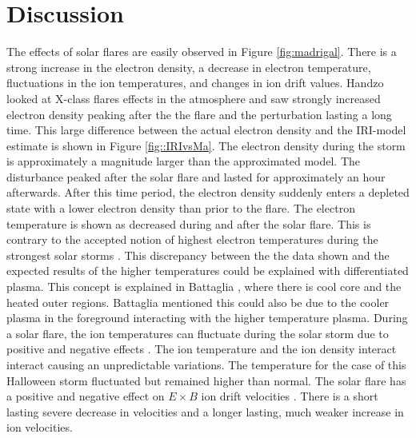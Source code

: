
\section{Discussion}

The effects of solar flares are easily observed in Figure \ref{fig:madrigal}.
There is a strong increase in the electron density, a decrease in electron temperature, fluctuations in the ion temperatures, and changes in ion drift values.
Handzo \cite{Handzo} looked at X-class flares effects in the atmosphere and saw strongly increased electron density peaking after the the flare and the perturbation lasting a long time. This large difference between the actual electron density and the IRI-model estimate is shown in Figure \ref{fig::IRIvsMa}. The electron density during the storm is approximately a magnitude larger than the approximated model. The disturbance peaked after the solar flare and lasted for approximately an hour afterwards. After this time period, the electron density suddenly enters a depleted state with a lower electron density than prior to the flare.
The electron temperature is shown as decreased during and after the solar flare. This is contrary to the accepted notion of highest electron temperatures during the strongest solar storms \cite{Caspi}. This discrepancy between the the data shown and the expected results of the higher temperatures could be explained with differentiated plasma. This concept is explained in Battaglia \cite{Battaglia}, where there is cool core and the heated outer regions. Battaglia mentioned this could also be due to the cooler plasma in the foreground interacting with the higher temperature plasma.
During a solar flare, the ion temperatures can fluctuate during the solar storm due to positive and negative effects \cite{ITemp}. The ion temperature and the ion density interact interact causing an unpredictable variations. The temperature for the case of this Halloween storm fluctuated but remained higher than normal.
The solar flare has a positive and negative effect on $E \times B$ ion drift velocities \cite{IDrift}. There is a short lasting severe decrease in velocities and a longer lasting, much weaker increase in ion velocities.
